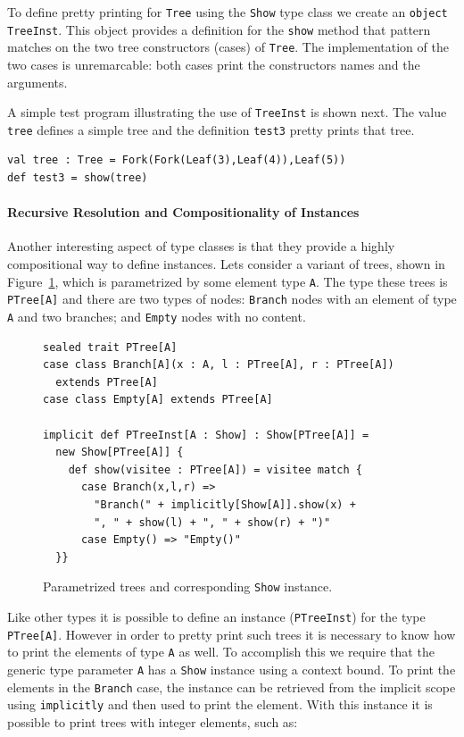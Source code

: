 \documentclass[preprint,nocopyrightspace]{sigplanconf}
\begin{document}
To define pretty printing for \lstinline{Tree} using the
\lstinline{Show} type class we create an \lstinline{object TreeInst}.
This object provides a definition for the
\lstinline{show} method that pattern matches on the
two tree constructors (cases) of \lstinline{Tree}. The implementation
of the two cases is unremarcable: both cases print the
constructors names and the arguments.

A simple test program illustrating the use of \lstinline{TreeInst}
is shown next. The value \lstinline{tree} defines a simple tree and the
definition \lstinline{test3} pretty prints that tree.

\begin{lstlisting}
val tree : Tree = Fork(Fork(Leaf(3),Leaf(4)),Leaf(5))
def test3 = show(tree)
\end{lstlisting}

\paragraph{Recursive Resolution and Compositionality of Instances}
Another interesting aspect of type classes is that they provide a
highly compositional way to define instances.
Lets consider a variant of trees, shown in Figure~\ref{fig:ptrees}, which is
parametrized by some element type \lstinline{A}. The type these trees
is \lstinline{PTree[A]} and there are two types of nodes:
\lstinline{Branch} nodes with an element of type \lstinline{A}
and two branches; and \lstinline{Empty} nodes with no content.

\begin{figure}
\begin{lstlisting}
sealed trait PTree[A]
case class Branch[A](x : A, l : PTree[A], r : PTree[A])
  extends PTree[A]
case class Empty[A] extends PTree[A]

implicit def PTreeInst[A : Show] : Show[PTree[A]] =
  new Show[PTree[A]] {
    def show(visitee : PTree[A]) = visitee match {
      case Branch(x,l,r) =>
        "Branch(" + implicitly[Show[A]].show(x) +
        ", " + show(l) + ", " + show(r) + ")"
      case Empty() => "Empty()"
  }}
\end{lstlisting}
\caption{Parametrized trees and corresponding \lstinline{Show}
  instance.}
\label{fig:ptrees}
\end{figure}

Like other types it is possible to define an instance (\lstinline{PTreeInst})
for the type \lstinline{PTree[A]}. However in order to pretty print
such trees it is necessary to know how to print the elements of type
\lstinline{A} as well. To accomplish this we require that the
generic type parameter \lstinline{A} has a \lstinline{Show} instance
using a context bound.  To print the elements in the
\lstinline{Branch} case, the instance can be retrieved from the implicit
scope using \lstinline{implicitly} and then used to print the element.
With this instance it is possible to print trees with integer elements, such as:
\end{document}
